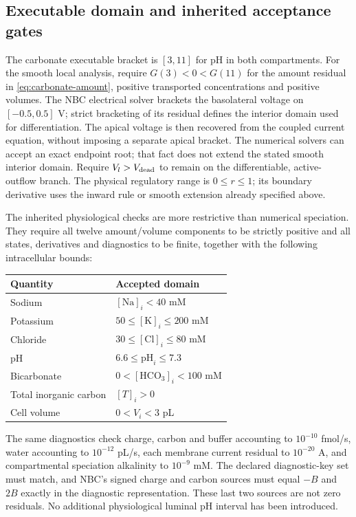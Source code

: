 \subsection{Executable domain and inherited acceptance gates}
The carbonate executable bracket is $[3,11]$ for pH in both compartments.
For the smooth local analysis, require $G(3)<0<G(11)$ for the amount residual
in \eqref{eq:carbonate-amount}, positive transported concentrations and
positive volumes. The NBC electrical solver brackets the basolateral
voltage on $[-0.5,0.5]$ V; strict bracketing of its residual defines the
interior domain used for differentiation. The apical voltage is then
recovered from the coupled current equation, without imposing a separate
apical bracket. The numerical solvers can accept an exact endpoint root;
that fact does not extend the stated smooth interior domain. Require
$V_l>V_{\rm dead}$ to remain on the differentiable, active-outflow branch.
The physical regulatory range is $0\leq r\leq1$; its boundary derivative
uses the inward rule or smooth extension already specified above.

The inherited physiological checks are more restrictive than numerical
speciation. They require all twelve amount/volume components to be strictly
positive and all states, derivatives and diagnostics to be finite, together
with the following intracellular bounds:
\begin{center}
\begin{tabular}{ll}\hline
Quantity & Accepted domain\\\hline
Sodium & $[\mathrm{Na}]_i<40$ mM\\
Potassium & $50\leq[\mathrm K]_i\leq200$ mM\\
Chloride & $30\leq[\mathrm{Cl}]_i\leq80$ mM\\
pH & $6.6\leq\mathrm{pH}_i\leq7.3$\\
Bicarbonate & $0<[\mathrm{HCO}_3]_i<100$ mM\\
Total inorganic carbon & $[T]_i>0$\\
Cell volume & $0<V_i<3$ pL\\\hline
\end{tabular}
\end{center}
The same diagnostics check charge, carbon and buffer accounting to
$10^{-10}$ fmol/s, water accounting to $10^{-12}$ pL/s, each membrane
current residual to $10^{-20}$ A, and compartmental speciation alkalinity
to $10^{-9}$ mM. The declared diagnostic-key set must match, and NBC's
signed charge and carbon sources must equal $-B$ and $2B$ exactly in the
diagnostic representation. These last two sources are not zero residuals.
No additional physiological luminal pH interval has been introduced.

